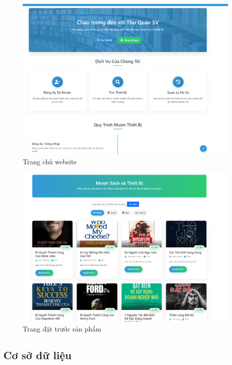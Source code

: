 \documentclass{article}
\begin{document}
\begin{figure} [H]
    \centering
    \includegraphics[width=0.9\linewidth]{images//Website/website.png}
    \caption{Trang chủ website}
    \label{fig:enter-label}
\end{figure}

\begin{figure} [H]
    \centering
    \includegraphics[width=0.9\linewidth]{images//Website/page đặt trước sp.png}
    \caption{Trang đặt trước sản phẩm}
    \label{fig:enter-label}
\end{figure}

\subsection{Cơ sở dữ liệu}
\end{document}
